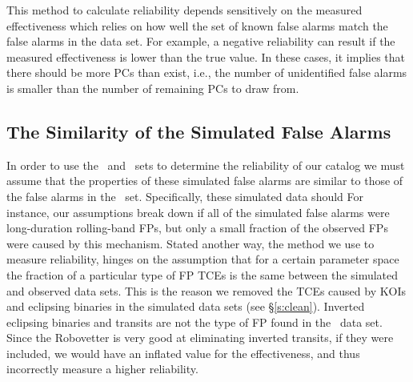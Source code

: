 This method to calculate reliability depends sensitively on the measured effectiveness which relies on how well the set of known false alarms match the false alarms in the \opstce{} data set. For example, a negative reliability can result if the measured effectiveness is lower than the true value. In these cases, it implies that there should be more PCs than exist, i.e., the number of unidentified false alarms is smaller than the number of remaining PCs to draw from.  


\subsection{The Similarity of the Simulated False Alarms}
\label{s:simularity}
In order to use the \scrtce\ and \invtce\ sets to determine the reliability of our catalog we must assume that the properties of these simulated false alarms are similar to those of the false alarms in the \opstce\ set.  Specifically, these simulated data should  For instance, our assumptions break down if all of the simulated false alarms were long-duration rolling-band FPs, but only a small fraction of the observed FPs were caused by this mechanism.  Stated another way, the method we use to measure reliability, hinges on the assumption that for a certain parameter space the fraction of a particular type of FP TCEs is the same between the simulated and observed data sets.  This is the reason we removed the TCEs caused by KOIs and eclipsing binaries in the simulated data sets (see \S\ref{s:clean}). Inverted eclipsing binaries and transits are not the type of FP found in the \opstce\ data set.  Since the Robovetter is very good at eliminating inverted transits, if they were included, we would have an inflated value for the effectiveness, and thus incorrectly measure a higher reliability. 

